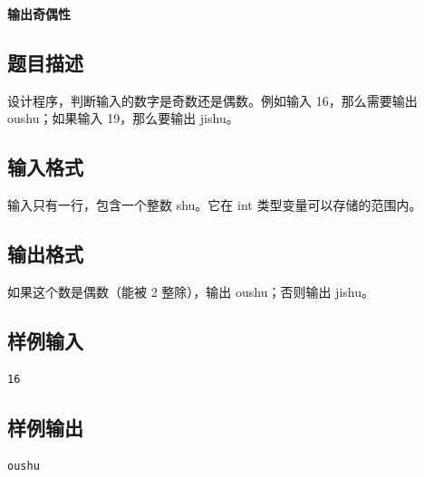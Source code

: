 \documentclass{article}
\newcommand{\problemname}[1]{\begin{center}\Large\bfseries #1\end{center}}
\begin{document}
\problemname{输出奇偶性}

\subsection*{题目描述}
设计程序，判断输入的数字是奇数还是偶数。例如输入 16，那么需要输出 oushu；如果输入 19，那么要输出 jishu。

\subsection*{输入格式}
输入只有一行，包含一个整数 shu。它在 int 类型变量可以存储的范围内。

\subsection*{输出格式}
如果这个数是偶数（能被 2 整除），输出 oushu；否则输出 jishu。

\subsection*{样例输入}
\begin{verbatim}
16
\end{verbatim}

\subsection*{样例输出}
\begin{verbatim}
oushu
\end{verbatim}
\end{document}
